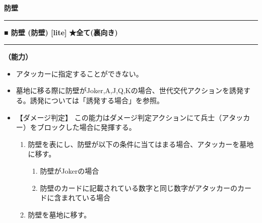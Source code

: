 \documentclass[twocolumn,a5paper,papersize,10pt]{jarticle}
\begin{document}
\begin{tcolorbox}
{\scriptsize\bf 防壁}
\end{tcolorbox}
\vspace{-1zh}%
\vspace{2mm} %
\hrule height 0.5mm depth 0mm width 66.5mm %
\vspace{1mm} %
{\small\bf ■ 防壁 {\scriptsize (防壁) [lite]}} %
\hfill 
{\footnotesize\bf ★全て(裏向き) }

\vspace{1mm}%
\hrule height 0.1mm depth 0mm width 66.5mm %
\vspace{1mm}%

{\bf（能力）}


\vspace{-1zh}%
\begin{itemize}
\setlength{\leftskip}{-0.3cm}
\setlength{\parskip}{0pt} %

\item アタッカーに指定することができない。

\item 墓地に移る際に防壁がJoker,A,J,Q,Kの場合、世代交代アクションを誘発する。誘発については「誘発する場合」を参照。

\item 【ダメージ判定】 この能力はダメージ判定アクションにて兵士（アタッカー）をブロックした場合に発揮する。

\vspace{-1zh}%
\begin{enumerate}
\setlength{\leftskip}{-0.3cm}
\setlength{\parskip}{0pt} %

\item 防壁を表にし、防壁が以下の条件に当てはまる場合、アタッカーを墓地に移す。

\begin{enumerate}
\renewcommand{\labelenumi}{\Alph{enumi}}
\setlength{\leftskip}{-0.3cm}
\setlength{\parskip}{0pt} %

\item 防壁がJokerの場合

\item 防壁のカードに記載されている数字と同じ数字がアタッカーのカードに含まれている場合

\end{enumerate}
\item 防壁を墓地に移す。
\vspace{-1zh}%
\end{enumerate}\vspace{-1zh}%
\end{itemize}
\end{document}
